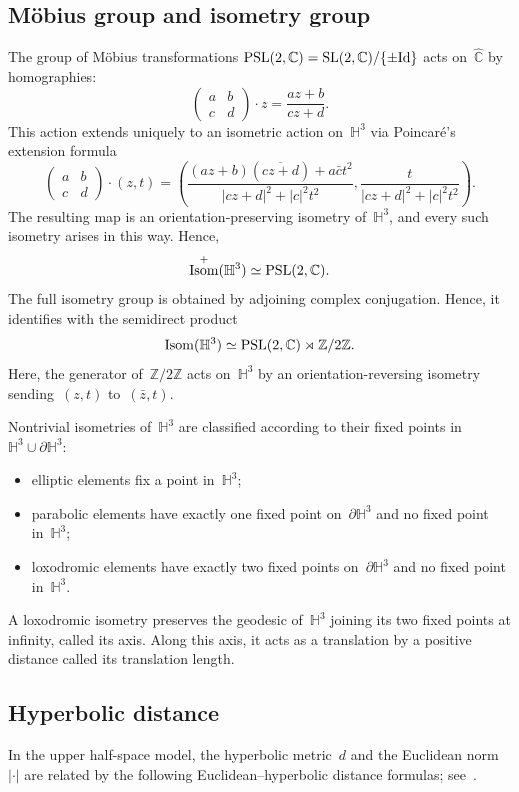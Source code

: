 \documentclass[11pt,reqno]{amsart}
\theoremstyle{definition}
\numberwithin{equation}{section}
\newcommand\Z {{\mathbb Z}}
\newcommand\C {{\mathbb C}}
\newcommand{\HH}{{\mathbb H}}
\DeclareMathOperator{\Isom}{{\rm Isom}}
\newcommand{\PSL}{{\rm PSL}}
\newcommand{\SL}{{\rm SL}}
\numberwithin{equation}{section}
\begin{document}
\subsection{M\"obius group and isometry group}
The group of M\"obius transformations $\PSL(2,\C) =\SL(2,\C)/\{ \pm \textrm{Id} \}$ acts on~$\hat{\C}$ by homographies:
\[
\begin{pmatrix}
a & b \\
c & d
\end{pmatrix}
\cdot z = \frac{az+b}{cz+d}.
\]
This action extends uniquely to an isometric action on~$\HH^3$ via Poincar\'e's extension formula
\begin{equation} \label{eq:extension}
\begin{pmatrix}
a & b \\
c & d
\end{pmatrix}
\cdot (z,t) = \left( \frac{(az+b)(\overline{cz+d})+a\bar{c} t^2}{|cz+d|^2+|c|^2 t^2}, \frac{t}{|cz+d|^2+|c|^2 t^2} \right).
\end{equation}
The resulting map is an orientation-preserving isometry of~$\HH^3$, and every such isometry arises in this way.
Hence,
\[
\Isom^+(\HH^3) \simeq \PSL(2,\C).
\]
The full isometry group is obtained by adjoining complex conjugation.
Hence, it identifies with the semidirect product
\[
\Isom(\HH^3) \simeq \PSL(2,\C) \rtimes \Z/2\Z.
\]
Here, the generator of~$\Z/2\Z$ acts on~$\HH^3$ by an orientation-reversing isometry sending~$(z,t)$ to~$(\bar{z},t)$.

\medskip

Nontrivial isometries of~$\HH^3$ are classified according to their fixed points in~$\HH^3 \cup \partial \HH^3$:
\begin{itemize}
\item elliptic elements fix a point in~$\HH^3$;
\item parabolic elements have exactly one fixed point on~$\partial \HH^3$ and no fixed point in~$\HH^3$;
\item loxodromic elements have exactly two fixed points on~$\partial \HH^3$ and no fixed point in~$\HH^3$.
\end{itemize}
A loxodromic isometry preserves the geodesic of~$\HH^3$ joining its two fixed points at infinity, called its axis.
Along this axis, it acts as a translation by a positive distance called its translation length.


\subsection{Hyperbolic distance}
In the upper half-space model, the hyperbolic metric~$d$ and the Euclidean norm~$|\cdot|$ are related by the following Euclidean--hyperbolic distance formulas; see~\cite[Theorem~4.6.1]{ratcliffe}.
\end{document}

